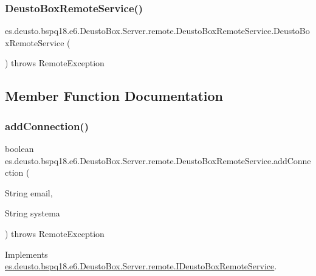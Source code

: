 \subsubsection{\texorpdfstring{Deusto\+Box\+Remote\+Service()}{DeustoBoxRemoteService()}}
{\footnotesize\ttfamily es.\+deusto.\+bspq18.\+e6.\+Deusto\+Box.\+Server.\+remote.\+Deusto\+Box\+Remote\+Service.\+Deusto\+Box\+Remote\+Service (\begin{DoxyParamCaption}{ }\end{DoxyParamCaption}) throws Remote\+Exception}



\subsection{Member Function Documentation}
\mbox{\label{classes_1_1deusto_1_1bspq18_1_1e6_1_1_deusto_box_1_1_server_1_1remote_1_1_deusto_box_remote_service_af3b4ec328dd57b15aefff6d9112dab94}} 
\subsubsection{\texorpdfstring{add\+Connection()}{addConnection()}}
{\footnotesize\ttfamily boolean es.\+deusto.\+bspq18.\+e6.\+Deusto\+Box.\+Server.\+remote.\+Deusto\+Box\+Remote\+Service.\+add\+Connection (\begin{DoxyParamCaption}\item[{String}]{email,  }\item[{String}]{systema }\end{DoxyParamCaption}) throws Remote\+Exception}



Implements \mbox{\hyperlink{interfacees_1_1deusto_1_1bspq18_1_1e6_1_1_deusto_box_1_1_server_1_1remote_1_1_i_deusto_box_remote_service_a77a145d7830ce7342da34df1efc71189}{es.\+deusto.\+bspq18.\+e6.\+Deusto\+Box.\+Server.\+remote.\+I\+Deusto\+Box\+Remote\+Service}}.

